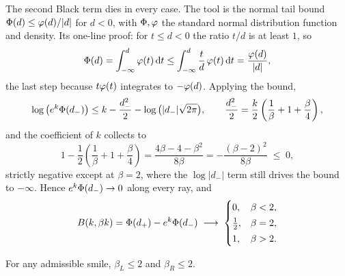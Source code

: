 The second Black term dies in every case.  The tool is the normal
tail bound $\Phi(d)\le\varphi(d)/|d|$ for $d<0$, with $\Phi,\varphi$
the standard normal distribution function and density.  Its one-line
proof: for $t\le d<0$ the ratio $t/d$ is at least $1$, so
\[
\Phi(d)=\int_{-\infty}^{d}\varphi(t)\,\mathrm{d} t
\le\int_{-\infty}^{d}\frac{t}{d}\,\varphi(t)\,\mathrm{d} t
=\frac{\varphi(d)}{|d|},
\]
the last step because $t\varphi(t)$ integrates to $-\varphi(d)$.
Applying the bound,
\[
\log\big(e^{k}\Phi(d_{-})\big)
\le k-\frac{d_{-}^{2}}{2}-\log\big(|d_{-}|\sqrt{2\pi}\big),
\qquad
\frac{d_{-}^{2}}{2}
=\frac{k}{2}\left(\frac{1}{\beta}+1+\frac{\beta}{4}\right),
\]
and the coefficient of $k$ collects to
\begin{equation}
1-\frac12\left(\frac1\beta+1+\frac\beta4\right)
=\frac{4\beta-4-\beta^{2}}{8\beta}
=-\frac{(\beta-2)^{2}}{8\beta}\;\le\;0 ,
\label{eq:vsdecay}
\end{equation}
strictly negative except at $\beta=2$, where the $\log|d_{-}|$ term
still drives the bound to $-\infty$.  Hence
$e^{k}\Phi(d_{-})\to0$ along every ray, and
\begin{equation}
B(k,\beta k)=\Phi(d_{+})-e^{k}\Phi(d_{-})
\;\longrightarrow\;
\begin{cases}
0, & \beta<2,\\[2pt]
\tfrac12, & \beta=2,\\[2pt]
1, & \beta>2 .
\end{cases}
\label{eq:vsraylimits}
\end{equation}

\begin{proposition}
\label{prop:vsceiling}
For any admissible smile, $\beta_L\le2$ and $\beta_R\le2$.
\end{proposition}

